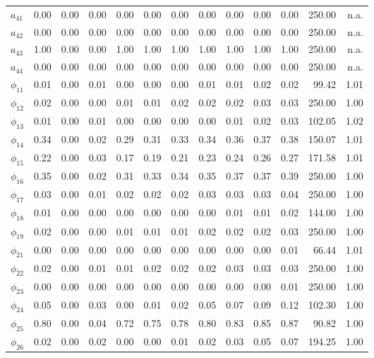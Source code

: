 \documentclass[]{article}
\begin{document}
\begin{table}[ht]
\begin{tabularx}{\textwidth}{lRRRRRRRRRRRR}
  $a_{41}$ & 0.00 & 0.00 & 0.00 & 0.00 & 0.00 & 0.00 & 0.00 & 0.00 & 0.00 & 0.00 & 250.00 & n.a. \\ 
  $a_{42}$ & 0.00 & 0.00 & 0.00 & 0.00 & 0.00 & 0.00 & 0.00 & 0.00 & 0.00 & 0.00 & 250.00 & n.a. \\ 
  $a_{43}$ & 1.00 & 0.00 & 0.00 & 1.00 & 1.00 & 1.00 & 1.00 & 1.00 & 1.00 & 1.00 & 250.00 & n.a. \\ 
  $a_{44}$ & 0.00 & 0.00 & 0.00 & 0.00 & 0.00 & 0.00 & 0.00 & 0.00 & 0.00 & 0.00 & 250.00 & n.a. \\ 
   \midrule
$\phi_{11}$ & 0.01 & 0.00 & 0.01 & 0.00 & 0.00 & 0.00 & 0.01 & 0.01 & 0.02 & 0.02 & 99.42 & 1.01 \\ 
  $\phi_{12}$ & 0.02 & 0.00 & 0.00 & 0.01 & 0.01 & 0.02 & 0.02 & 0.02 & 0.03 & 0.03 & 250.00 & 1.00 \\ 
  $\phi_{13}$ & 0.01 & 0.00 & 0.01 & 0.00 & 0.00 & 0.00 & 0.00 & 0.01 & 0.02 & 0.03 & 102.05 & 1.02 \\ 
  $\phi_{14}$ & 0.34 & 0.00 & 0.02 & 0.29 & 0.31 & 0.33 & 0.34 & 0.36 & 0.37 & 0.38 & 150.07 & 1.01 \\ 
  $\phi_{15}$ & 0.22 & 0.00 & 0.03 & 0.17 & 0.19 & 0.21 & 0.23 & 0.24 & 0.26 & 0.27 & 171.58 & 1.01 \\ 
  $\phi_{16}$ & 0.35 & 0.00 & 0.02 & 0.31 & 0.33 & 0.34 & 0.35 & 0.37 & 0.37 & 0.39 & 250.00 & 1.00 \\ 
  $\phi_{17}$ & 0.03 & 0.00 & 0.01 & 0.02 & 0.02 & 0.02 & 0.03 & 0.03 & 0.03 & 0.04 & 250.00 & 1.00 \\ 
  $\phi_{18}$ & 0.01 & 0.00 & 0.00 & 0.00 & 0.00 & 0.00 & 0.00 & 0.01 & 0.01 & 0.02 & 144.00 & 1.00 \\ 
  $\phi_{19}$ & 0.02 & 0.00 & 0.00 & 0.01 & 0.01 & 0.01 & 0.02 & 0.02 & 0.02 & 0.03 & 250.00 & 1.00 \\ 
  $\phi_{21}$ & 0.00 & 0.00 & 0.00 & 0.00 & 0.00 & 0.00 & 0.00 & 0.00 & 0.00 & 0.01 & 66.44 & 1.01 \\ 
  $\phi_{22}$ & 0.02 & 0.00 & 0.01 & 0.01 & 0.02 & 0.02 & 0.02 & 0.03 & 0.03 & 0.03 & 250.00 & 1.00 \\ 
  $\phi_{23}$ & 0.00 & 0.00 & 0.00 & 0.00 & 0.00 & 0.00 & 0.00 & 0.00 & 0.00 & 0.01 & 250.00 & 1.00 \\ 
  $\phi_{24}$ & 0.05 & 0.00 & 0.03 & 0.00 & 0.01 & 0.02 & 0.05 & 0.07 & 0.09 & 0.12 & 102.30 & 1.00 \\ 
  $\phi_{25}$ & 0.80 & 0.00 & 0.04 & 0.72 & 0.75 & 0.78 & 0.80 & 0.83 & 0.85 & 0.87 & 90.82 & 1.00 \\ 
  $\phi_{26}$ & 0.02 & 0.00 & 0.02 & 0.00 & 0.00 & 0.01 & 0.02 & 0.03 & 0.05 & 0.07 & 194.25 & 1.00 \\ 

\end{tabularx}
\end{table}
\end{document}

